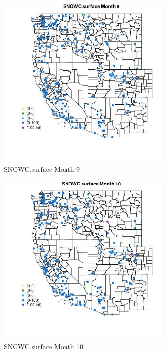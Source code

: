 \begin{figure} 
\centering  
\includegraphics[width=0.77\textwidth]{Code_Outputs/Report_ML_input_PM25_Step4_part_e_de_duplicated_aveswNAs_MapObsMo9SNOWCsurface.jpg} 
\caption{\label{fig:Report_ML_input_PM25_Step4_part_e_de_duplicated_aveswNAsMapObsMo9SNOWCsurface}SNOWC.surface Month 9} 
\end{figure} 
 

\begin{figure} 
\centering  
\includegraphics[width=0.77\textwidth]{Code_Outputs/Report_ML_input_PM25_Step4_part_e_de_duplicated_aveswNAs_MapObsMo10SNOWCsurface.jpg} 
\caption{\label{fig:Report_ML_input_PM25_Step4_part_e_de_duplicated_aveswNAsMapObsMo10SNOWCsurface}SNOWC.surface Month 10} 
\end{figure} 
 

